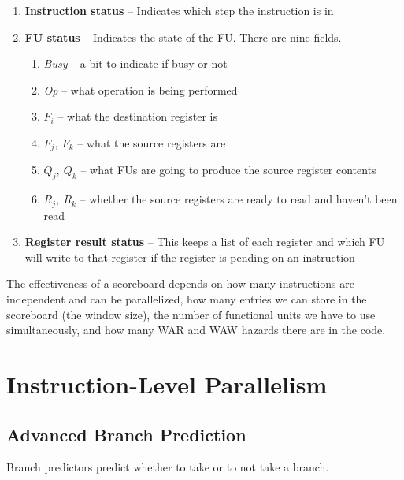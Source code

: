 \documentclass{article}
\begin{document}
\begin{enumerate}
\item \textbf{Instruction status} -- Indicates which step the instruction is in

\item \textbf{FU status} -- Indicates the state of the FU. There are nine fields.

\begin{enumerate}
\item \textit{Busy} -- a bit to indicate if busy or not

\item \textit{Op} -- what operation is being performed

\item \textit{$F_i$} -- what the destination register is

\item \textit{$F_j,\ F_k$} -- what the source registers are

\item \textit{$Q_j,\ Q_k$} -- what FUs are going to produce the source register contents

\item \textit{$R_j,\ R_k$} -- whether the source registers are ready to read and haven't been read 
\end{enumerate}

\item \textbf{Register result status} -- This keeps a list of each register and which FU will write to that register if the register is pending on an instruction
\end{enumerate}


The effectiveness of a scoreboard depends on how many instructions are independent and can be parallelized, how many entries we can store in the scoreboard (the window size), the number of functional units we have to use simultaneously, and how many WAR and WAW hazards there are in the code.


\section{Instruction-Level Parallelism}


\subsection{Advanced Branch Prediction}

Branch predictors predict whether to take or to not take a branch. 
\end{document}

